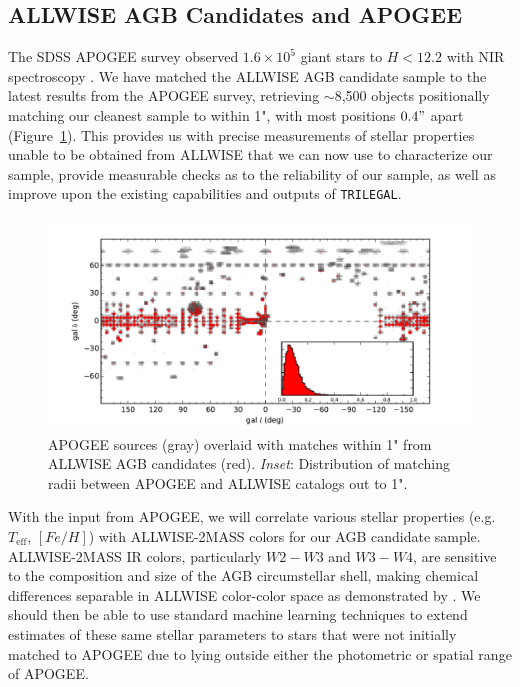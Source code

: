 \subsection{ALLWISE AGB Candidates and APOGEE}
\label{sec:apogee}
The SDSS APOGEE survey observed $1.6\times10^5$ giant stars to $H < 12.2$ with NIR spectroscopy \citep{2012ApJ...755L..25N}. We have matched the ALLWISE AGB candidate sample to the latest results from the APOGEE survey, retrieving $\sim$8,500 objects positionally matching our cleanest sample to within 1", with most positions $0.4"$ apart (Figure~\ref{fig:apogee_allwise}).  This provides us with precise measurements of stellar properties unable to be obtained from ALLWISE that we can now use to characterize our sample, provide measurable checks as to the reliability of our sample, as well as improve upon the existing capabilities and outputs of {\tt TRILEGAL}.

\begin{figure}[h]
\centering
\includegraphics[width=6.5in]{figs/apogee_allwise_overlay.pdf}
\caption{{\footnotesize APOGEE sources (gray) overlaid with matches within 1" from ALLWISE AGB candidates (red). \emph{Inset}: Distribution of matching radii between APOGEE and ALLWISE catalogs out to 1".}}
\label{fig:apogee_allwise}
\end{figure}

With the input from APOGEE, we will correlate various stellar properties (e.g. $T_\text{eff}$, $[Fe/H]$) with ALLWISE-2MASS colors for our AGB candidate sample. ALLWISE-2MASS IR colors, particularly $W2-W3$ and $W3-W4$, are sensitive to the composition and size of the AGB circumstellar shell, making chemical differences separable in ALLWISE color-color space as demonstrated by \cite{2014MNRAS.442.3361N}. We should then be able to use standard machine learning techniques \citep[e.g. those found in ][]{2013sdmm.book.....I} to extend estimates of these same stellar parameters to stars that were not initially matched to APOGEE due to lying outside either the photometric or spatial range of APOGEE.

